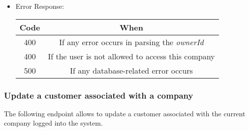 \begin{itemize}
    \item Error Response:
    \begin{table}[!h]
    \centering
    \begin{tabular}{|c|c|}
    \hline
    \multicolumn{1}{|c|}{\textbf{Code}} & \multicolumn{1}{c|}{\textbf{When}} \\ \hline
    400 & If any error occurs in parsing the \textit{ownerId}  \\\hline
    400 & If the user is not allowed to access this company \\\hline
    500 & If any database-related error occurs \\\hline
    \end{tabular}
    \end{table}

\end{itemize}


\newpage
\subsubsection*{Update a customer associated with a company}

The following endpoint allows to update a customer associated with the current company logged into the system.

